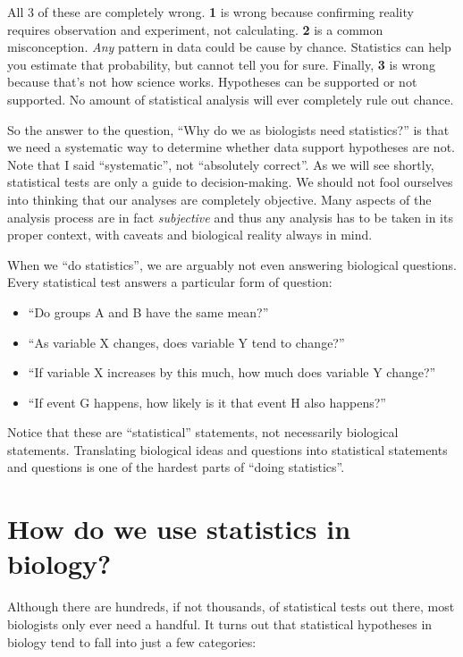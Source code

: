\documentclass[
  13,
  letterpaper,
]{report}
\begin{document}
All 3 of these are completely wrong. \textbf{1} is wrong because
confirming reality requires observation and experiment, not calculating.
\textbf{2} is a common misconception. \emph{Any} pattern in data could
be cause by chance. Statistics can help you estimate that probability,
but cannot tell you for sure. Finally, \textbf{3} is wrong because
that's not how science works. Hypotheses can be supported or not
supported. No amount of statistical analysis will ever completely rule
out chance.

So the answer to the question, ``Why do we as biologists need
statistics?'' is that we need a systematic way to determine whether data
support hypotheses are not. Note that I said ``systematic'', not
``absolutely correct''. As we will see shortly, statistical tests are
only a guide to decision-making. We should not fool ourselves into
thinking that our analyses are completely objective. Many aspects of the
analysis process are in fact \emph{subjective} and thus any analysis has
to be taken in its proper context, with caveats and biological reality
always in mind.

When we ``do statistics'', we are arguably not even answering biological
questions. Every statistical test answers a particular form of question:

\begin{itemize}
\item
  ``Do groups A and B have the same mean?''
\item
  ``As variable X changes, does variable Y tend to change?''
\item
  ``If variable X increases by this much, how much does variable Y
  change?''
\item
  ``If event G happens, how likely is it that event H also happens?''
\end{itemize}

Notice that these are ``statistical'' statements, not necessarily
biological statements. Translating biological ideas and questions into
statistical statements and questions is one of the hardest parts of
``doing statistics''.

\section{How do we use statistics in biology?}\label{sec-intro-tests}

Although there are hundreds, if not thousands, of statistical tests out
there, most biologists only ever need a handful. It turns out that
statistical hypotheses in biology tend to fall into just a few
categories:
\end{document}
